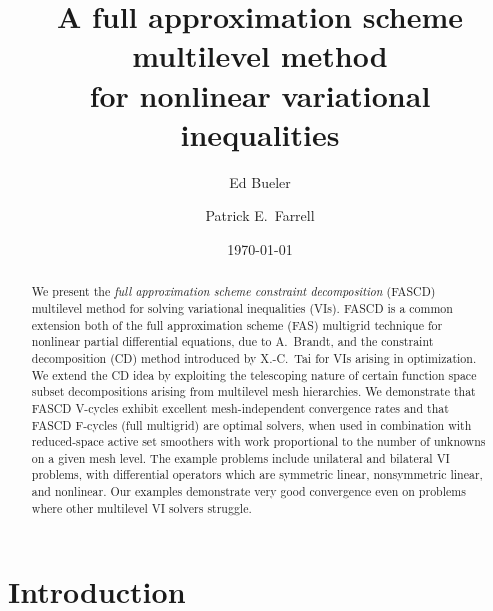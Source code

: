 \documentclass[letterpaper,final,12pt,reqno]{amsart}
\theoremstyle{cstyle}
\theoremstyle{cstyle*}
\theoremstyle{dstyle}
\numberwithin{equation}{section}
\numberwithin{figure}{section}
\numberwithin{table}{section}
\numberwithin{theorem}{section}
\begin{document}
\title[FAS for nonlinear variational inequalities]{A full approximation scheme multilevel method \\ for nonlinear variational inequalities}

\author{Ed Bueler}

\author{Patrick E.~Farrell}

\date{\today}

\begin{abstract}
We present the \emph{full approximation scheme constraint decomposition} (FASCD) multilevel method for solving variational inequalities (VIs).  FASCD is a common extension both of the full approximation scheme (FAS) multigrid technique for nonlinear partial differential equations, due to A.~Brandt, and the constraint decomposition (CD) method introduced by X.-C.~Tai for VIs arising in optimization.  We extend the CD idea by exploiting the telescoping nature of certain function space subset decompositions arising from multilevel mesh hierarchies.  We demonstrate that FASCD V-cycles exhibit excellent mesh-independent convergence rates and that FASCD F-cycles (full multigrid) are optimal solvers, when used in combination with reduced-space active set smoothers with work proportional to the number of unknowns on a given mesh level.  The example problems include unilateral and bilateral VI problems, with differential operators which are symmetric linear, nonsymmetric linear, and nonlinear.  Our examples demonstrate very good convergence even on problems where other multilevel VI solvers struggle.
\end{abstract}

\maketitle

\thispagestyle{empty}


\section{Introduction} \label{sec:intro}
\end{document}
